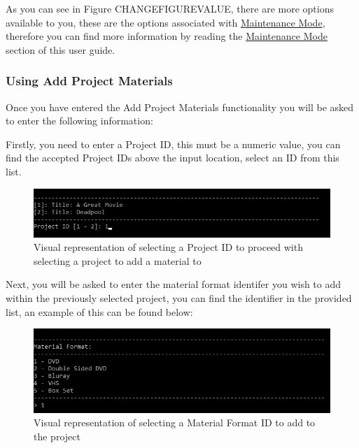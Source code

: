 \documentclass[
  english,
  a4paper,
,tablecaptionabove
]{scrartcl}
\begin{document}
As you can see in Figure CHANGEFIGUREVALUE, there are more options
available to you, these are the options associated with
\protect\hyperlink{using-maintenance-mode}{Maintenance Mode}, therefore
you can find more information by reading the
\protect\hyperlink{using-maintenance-mode}{Maintenance Mode} section of
this user guide.

\newpage

\hypertarget{using-add-project-materials}{%
\subsubsection{Using Add Project
Materials}\label{using-add-project-materials}}

Once you have entered the Add Project Materials functionality you will
be asked to enter the following information:

Firstly, you need to enter a Project ID, this must be a numeric value,
you can find the accepted Project IDs above the input location, select
an ID from this list.

\begin{figure}
\centering
\includegraphics{images/user-guide/maintenance-mode/update-project-select-id.png}
\caption{Visual representation of selecting a Project ID to proceed with
selecting a project to add a material to}
\end{figure}

Next, you will be asked to enter the material format identifer you wish
to add within the previously selected project, you can find the
identifier in the provided list, an example of this can be found below:

\begin{figure}
\centering
\includegraphics{images/user-guide/maintenance-mode/add-material-select-id.png}
\caption{Visual representation of selecting a Material Format ID to add
to the project}
\end{figure}
\end{document}
